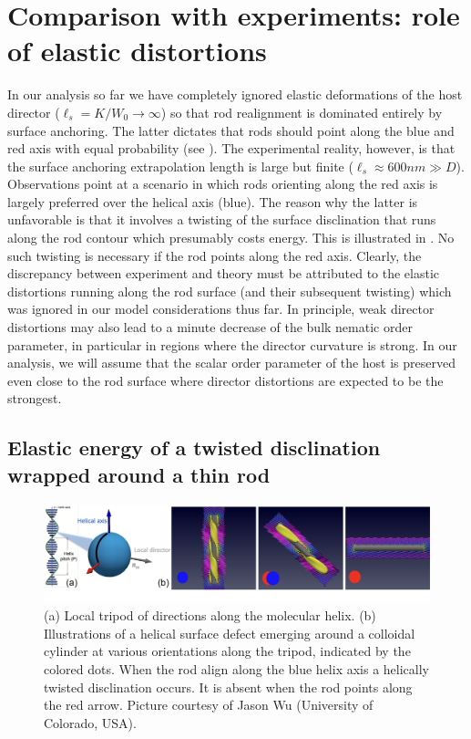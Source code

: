 \section[Role of elastic distortions]{Comparison with experiments: role of elastic distortions}

In our analysis so far we have completely ignored elastic deformations of the host director ($\ell_{s} = K/W_{0} \rightarrow \infty$) so that rod realignment is dominated entirely by surface anchoring. The latter dictates that rods should point along the blue and red axis with equal probability (see ). The experimental reality, however, is that the surface anchoring extrapolation length is large but finite ($\ell_{s} \approx 600 nm \gg D$). Observations point at a scenario in which  rods  orienting along the red axis is largely preferred over the helical axis (blue). The reason why the latter is unfavorable  is that it involves a twisting of the surface disclination that runs along the rod contour which presumably costs energy. This is illustrated in . No such twisting is necessary if the rod points along the red axis.   Clearly, the discrepancy between experiment and theory must be attributed to the  elastic distortions running along the rod surface (and their subsequent twisting) which was ignored in our model considerations thus far. In principle, weak director distortions may also lead to a minute decrease  of the bulk nematic order parameter,  in particular in regions where the director curvature is strong.  In our analysis, we will assume that the scalar order parameter of the host is preserved even close to the rod surface where director distortions are expected to be the strongest.



\subsection{Elastic energy of a twisted disclination wrapped around a thin rod}




\begin{figure}
	\includegraphics[width = \columnwidth]{figures/chapter-3/twisted_disclination}
	\caption{ (a) Local tripod of directions along the molecular helix. (b) Illustrations of a helical surface defect emerging around a colloidal cylinder at various orientations along the tripod, indicated by the colored dots. When the rod align along the blue helix axis a helically twisted disclination occurs. It is absent when the rod points along the red arrow. Picture courtesy of Jason Wu (University of Colorado, USA). }
	\label{twisdis}
\end{figure}




